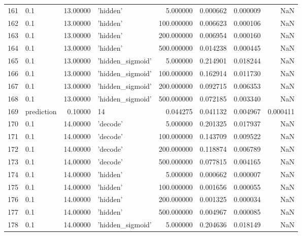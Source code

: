 \documentclass[10pt,a4paper]{article}
\begin{document}
\begin{tabular}{llrlrrrr}
161  &         0.1 &  13.00000 &           'hidden' &    5.000000 &  0.000662 &  0.000009 &       NaN \\
162  &         0.1 &  13.00000 &           'hidden' &  100.000000 &  0.006623 &  0.000106 &       NaN \\
163  &         0.1 &  13.00000 &           'hidden' &  200.000000 &  0.006954 &  0.000160 &       NaN \\
164  &         0.1 &  13.00000 &           'hidden' &  500.000000 &  0.014238 &  0.000445 &       NaN \\
165  &         0.1 &  13.00000 &   'hidden\_sigmoid' &    5.000000 &  0.214901 &  0.018244 &       NaN \\
166  &         0.1 &  13.00000 &   'hidden\_sigmoid' &  100.000000 &  0.162914 &  0.011730 &       NaN \\
167  &         0.1 &  13.00000 &   'hidden\_sigmoid' &  200.000000 &  0.092715 &  0.006353 &       NaN \\
168  &         0.1 &  13.00000 &   'hidden\_sigmoid' &  500.000000 &  0.072185 &  0.003340 &       NaN \\
169  &  prediction &   0.10000 &                 14 &    0.044275 &  0.041132 &  0.004967 &  0.000411 \\
170  &         0.1 &  14.00000 &           'decode' &    5.000000 &  0.201325 &  0.017937 &       NaN \\
171  &         0.1 &  14.00000 &           'decode' &  100.000000 &  0.143709 &  0.009522 &       NaN \\
172  &         0.1 &  14.00000 &           'decode' &  200.000000 &  0.118874 &  0.006789 &       NaN \\
173  &         0.1 &  14.00000 &           'decode' &  500.000000 &  0.077815 &  0.004165 &       NaN \\
174  &         0.1 &  14.00000 &           'hidden' &    5.000000 &  0.000662 &  0.000007 &       NaN \\
175  &         0.1 &  14.00000 &           'hidden' &  100.000000 &  0.001656 &  0.000055 &       NaN \\
176  &         0.1 &  14.00000 &           'hidden' &  200.000000 &  0.001325 &  0.000034 &       NaN \\
177  &         0.1 &  14.00000 &           'hidden' &  500.000000 &  0.004967 &  0.000085 &       NaN \\
178  &         0.1 &  14.00000 &   'hidden\_sigmoid' &    5.000000 &  0.204636 &  0.018149 &       NaN \\

\end{tabular}
\end{document}
